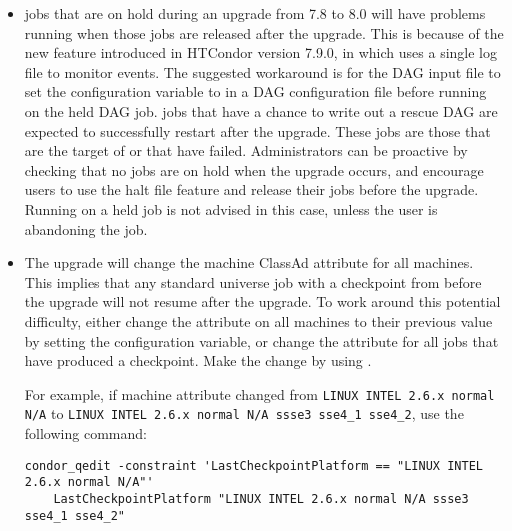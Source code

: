 \begin{itemize}

\item {} jobs that are on hold during an upgrade from 
7.8 to 8.0 will have
problems running when those jobs are released after the upgrade. 
This is because of
the new feature introduced in HTCondor version 7.9.0, 
in which  uses a single log file to monitor events.
The suggested workaround is for the
DAG input file to set the configuration variable 
 to
 in a DAG configuration file
 before running  on the held DAG job.
 jobs that have a chance to write out a rescue
DAG
are expected to successfully restart after the upgrade.
These jobs are those that are the target of  or that have failed.
Administrators can be proactive by
checking that no  jobs are on hold when the upgrade occurs,
and encourage users to use the halt file feature and release their 
 jobs before the upgrade.  
Running  on a held  job is
not advised in this case, unless the user is abandoning the job.

\item The upgrade will change the machine ClassAd attribute
 for all machines.
This implies that any standard universe job with a checkpoint 
from before the upgrade will not resume after the upgrade.
To work around this potential difficulty, either change the 
attribute  on all machines to their previous value 
by setting the  configuration variable,
or change the  attribute for all jobs
that have produced a checkpoint.
Make the change by using .

For example, if machine attribute  changed 
from \verb;LINUX INTEL 2.6.x normal N/A; to 
\verb;LINUX INTEL 2.6.x normal N/A ssse3 sse4_1 sse4_2;,
use the following command:

\footnotesize
\begin{verbatim}
condor_qedit -constraint 'LastCheckpointPlatform == "LINUX INTEL 2.6.x normal N/A"'
    LastCheckpointPlatform "LINUX INTEL 2.6.x normal N/A ssse3 sse4_1 sse4_2"
\end{verbatim}
\normalsize

\end{itemize}

